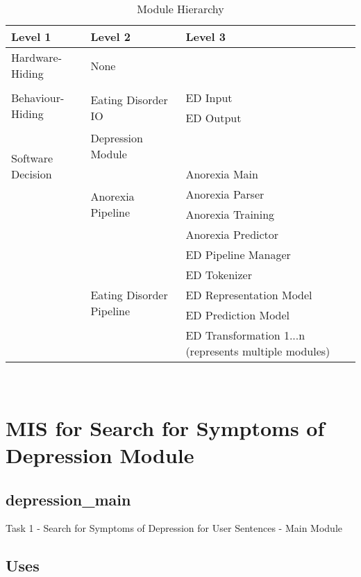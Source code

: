 \documentclass[12pt, titlepage]{article}
\begin{document}
\begin{table}[h!]
\centering
\begin{tabular}{p{} p{} p{}}
\toprule
\textbf{Level 1} & \textbf{Level 2} & \textbf{Level 3}\\
\midrule

{Hardware-Hiding} & None \\
\midrule

\multirow{3}{*}{Behaviour-Hiding} & \\ \cline{2-3}
& \multirow{2}{*}{Eating Disorder IO} & ED Input\\
& & ED Output\\
\midrule

\multirow{3}{*}{Software Decision} 
& Depression Module\\ \cline{2-3}
& \multirow{4}{*}{Anorexia Pipeline} & Anorexia Main\\ 
& & Anorexia Parser\\
& & Anorexia Training\\
& & Anorexia Predictor\\ \cline{2-3}
& \multirow{5}{*}{Eating Disorder Pipeline} & ED Pipeline Manager\\
& & ED Tokenizer\\
& & ED Representation Model\\
& & ED Prediction Model\\
& & ED Transformation 1...n (represents multiple modules)\\
\bottomrule

\end{tabular}
\caption{Module Hierarchy}
\label{TblMH}
\end{table}

\newpage
~\newpage

\section{MIS for Search for Symptoms of Depression Module} \label{Module} 

\subsection{depression\_main}

Task 1 - Search for Symptoms of Depression for User Sentences - Main Module


\subsection{Uses}
\end{document}
